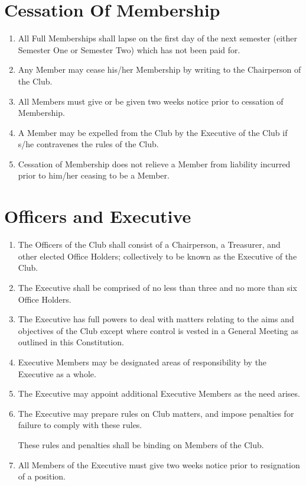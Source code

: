 \documentclass[a4paper]{article}
\begin{document}
	\section{Cessation Of Membership}
	
	\begin{enumerate}
		\item All Full Memberships shall lapse on the first day of the next semester (either Semester One or Semester Two) which has not been paid for.
		
		\item \label{cease-by-writing} Any Member may cease his/her Membership by writing to the Chairperson of the Club.
		
		\item All Members must give or be given two weeks notice prior to cessation of Membership.
		
		\item \label{cease-by-expulsion} A Member may be expelled from the Club by the Executive of the Club if s/he contravenes the rules of the Club.
		
		\item Cessation of Membership does not relieve a Member from liability incurred prior to him/her ceasing to be a Member.
	\end{enumerate}

	\section{Officers and Executive}
	
	\begin{enumerate}
		\item The Officers of the Club shall consist of a Chairperson, a Treasurer, and other elected Office Holders; collectively to be known as the Executive of the Club.
		
		\item The Executive shall be comprised of no less than three and no more than six Office Holders.
		
		\item The Executive has full powers to deal with matters relating to the aims and objectives of the Club except where control is vested in a General Meeting as outlined in this Constitution.
		
		\item Executive Members may be designated areas of responsibility by the Executive as a whole.
		
		\item The Executive may appoint additional Executive Members as the need arises.
		
		\item The Executive may prepare rules on Club matters, and impose penalties for failure to comply with these rules.
		
		These rules and penalties shall be binding on Members of the Club.
		\item All Members of the Executive must give two weeks notice prior to resignation of a position.
	\end{enumerate}
	
\end{document}
